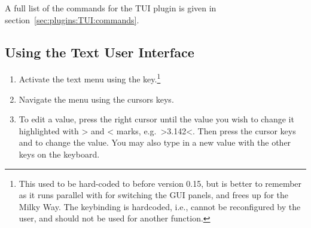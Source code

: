 A full list of the commands for the TUI plugin is
given in section~\ref{sec:plugins:TUI:commands}. 

\subsection{Using the Text User Interface}
\label{sec:plugins:TUI:using}

\begin{enumerate}
\item Activate the text menu using the  key.\footnote{This
    used to be hard-coded to  before version 0.15, but
     is better to remember as it runs parallel with
     for switching the GUI panels, and frees up 
    for the Milky Way. The  keybinding is hardcoded, i.e.,
    cannot be reconfigured by the user, and should not be used for
    another function.}
\item
  Navigate the menu using the cursors keys.
\item
  To edit a value, press the right cursor until the value you wish to
  change it highlighted with \textgreater{} and \textless{} marks, e.g.\
  \textgreater{}3.142\textless{}. Then press the cursor keys \keys{\arrowkeyup} and \keys{\arrowkeydown} to
  change the value. You may also type in a new value with the other keys
  on the keyboard.
\end{enumerate}


